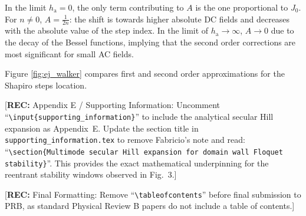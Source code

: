\documentclass[prb,aps,twocolumn,superscriptaddress,floatfix]{revtex4-1}
\newcommand{\rec}[1]{{\color{magenta}[\textbf{REC:} #1]}}
\begin{document}
In the limit $h_\text{a}=0$, the only term contributing to $A$ is the one proportional to $J_0$. For $n\neq0$, $A=\frac{1}{2n}$: the shift is towards higher absolute DC fields and decreases with the absolute value of the step index. In the limit of $h_\text{a}\to\infty$, $A\to 0$ due to the decay of the Bessel functions, implying that the second order corrections are most significant for small AC fields.

Figure \ref{fig:ej_walker} compares first and second order approximations for the Shapiro steps location.



% 
\rec{Appendix E / Supporting Information: Uncomment ``\texttt{\textbackslash input\{supporting\_information\}}'' to include the analytical secular Hill expansion as Appendix~E. Update the section title in \texttt{supporting\_information.tex} to remove Fabricio's note and read: ``\texttt{\textbackslash section\{Multimode secular Hill expansion for domain wall Floquet stability\}}''. This provides the exact mathematical underpinning for the reentrant stability windows observed in Fig.~3.}

\tableofcontents
\rec{Final Formatting: Remove ``\texttt{\textbackslash tableofcontents}'' before final submission to PRB, as standard Physical Review B papers do not include a table of contents.}
\end{document}
